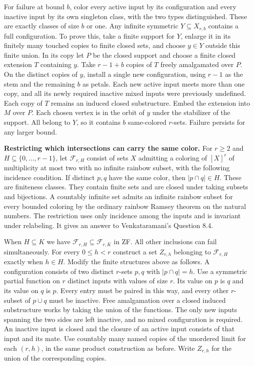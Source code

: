 \documentclass[11pt]{article}
\begin{document}
For failure at bound \(b\), color every active input by its configuration and every inactive input by its own singleton class, with the two types distinguished. These are exactly classes of size \(b\) or one. Any infinite symmetric \(Y\subseteq X_{r,b}\) contains a full configuration. To prove this, take a finite support for \(Y\), enlarge it in its finitely many touched copies to finite closed sets, and choose \(y\in Y\) outside this finite union. In its copy let \(P\) be the closed support and choose a finite closed extension \(T\) containing \(y\). Take \(r-1+b\) copies of \(T\) freely amalgamated over \(P\). On the distinct copies of \(y\), install a single new configuration, using \(r-1\) as the stem and the remaining \(b\) as petals. Each new active input meets more than one copy, and all its newly required inactive mixed inputs were previously undefined. Each copy of \(T\) remains an induced closed substructure. Embed the extension into \(M\) over \(P\). Each chosen vertex is in the orbit of \(y\) under the stabilizer of the support. All belong to \(Y\), so it contains \(b\) same-colored \(r\)-sets. Failure persists for any larger bound.

\textbf{Restricting which intersections can carry the same color.} For \(r\ge2\) and \(H\subseteq\{0,\ldots,r-1\}\), let \(\mathcal F_{r,H}\) consist of sets \(X\) admitting a coloring of \([X]^r\) of multiplicity at most two with no infinite rainbow subset, with the following incidence condition. If distinct \(p,q\) have the same color, then \(|p\cap q|\in H\). These are finiteness classes. They contain finite sets and are closed under taking subsets and bijections. A countably infinite set admits an infinite rainbow subset for every bounded coloring by the ordinary rainbow Ramsey theorem on the natural numbers. The restriction uses only incidence among the inputs and is invariant under relabeling. It gives an answer to Venkataramani's Question 8.4.

When \(H\subseteq K\) we have \(\mathcal F_{r,H}\subseteq\mathcal F_{r,K}\) in ZF. All other inclusions can fail simultaneously. For every \(0\le h<r\) construct a set \(Z_{r,h}\) belonging to \(\mathcal F_{r,H}\) exactly when \(h\in H\). Modify the finite structures above as follows. A configuration consists of two distinct \(r\)-sets \(p,q\) with \(|p\cap q|=h\). Use a symmetric partial function on \(r\) distinct inputs with values of size \(r\). Its value on \(p\) is \(q\) and its value on \(q\) is \(p\). Every entry must be paired in this way, and every other \(r\)-subset of \(p\cup q\) must be inactive. Free amalgamation over a closed induced substructure works by taking the union of the functions. The only new inputs spanning the two sides are left inactive, and no mixed configuration is required. An inactive input is closed and the closure of an active input consists of that input and its mate. Use countably many named copies of the unordered limit for each \((r,h)\), in the same product construction as before. Write \(Z_{r,h}\) for the union of the corresponding copies.
\end{document}
